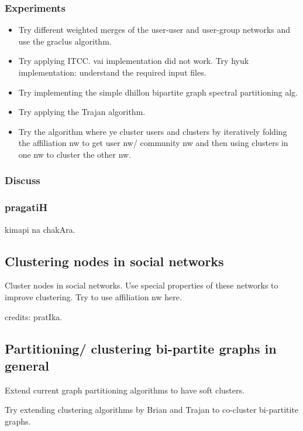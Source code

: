 \documentclass{article}
\begin{document}
\subsubsection{Experiments}
\begin{itemize}
\item Try different weighted merges of the user-user and user-group networks and use the graclus algorithm.

\item Try applying ITCC. vai implementation did not work. Try hyuk implementation: understand the required input files.

\item Try implementing the simple dhillon bipartite graph spectral partitioning alg.

\item Try applying the Trajan algorithm.

\item Try the algorithm where ye cluster users and clusters by iteratively folding the affiliation nw to get user nw/ community nw and then using clusters in one nw to cluster the other nw.
\end{itemize}

\subsubsection{Discuss}

\subsubsection{pragatiH}
kimapi na chakAra.

\subsection{Clustering nodes in social networks}
Cluster nodes in social networks. Use special properties of these networks to improve clustering. Try to use affiliation nw here.

credits: pratIka.

\subsection{Partitioning/ clustering bi-partite graphs in general}
Extend current graph partitioning algorithms to have soft clusters.

Try extending clustering algorithms by Brian and Trajan to co-cluster bi-partitite graphs.
\end{document}
